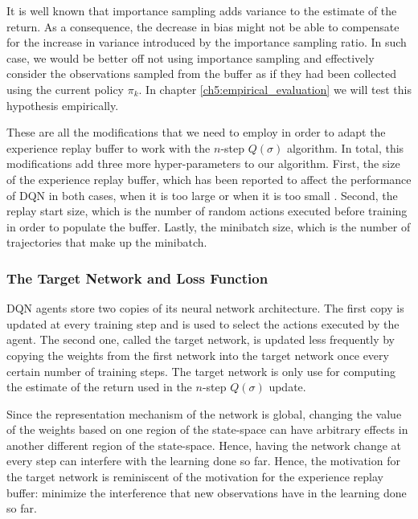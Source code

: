 It is well known that importance sampling adds variance to the estimate of the return.
As a consequence, the decrease in bias might not be able to compensate for the increase in variance introduced by the importance sampling ratio.
In such case, we would be better off not using importance sampling and effectively consider the observations sampled from the buffer as if they had been collected using the current policy $\pi_k$.
In chapter \ref{ch5:empirical_evaluation} we will test this hypothesis empirically.

These are all the modifications that we need to employ in order to adapt the experience replay buffer to work with the $n$-step $Q(\sigma)$ algorithm.
In total, this modifications add three more hyper-parameters to our algorithm.
First, the size of the experience replay buffer, which has been reported to affect the performance of DQN in both cases, when it is too large or when it is too small \parencite{shangtong2017}.
Second, the replay start size, which is the number of random actions executed before training in order to populate the buffer.
Lastly, the minibatch size, which is the number of trajectories that make up the minibatch.

\subsubsection{The Target Network and Loss Function}

DQN agents store two copies of its neural network architecture.
The first copy is updated at every training step and is used to select the actions executed by the agent.
The second one, called the target network, is updated less frequently by copying the weights from the first network into the target network once every certain number of training steps.
The target network is only use for computing the estimate of the return used in the $n$-step $Q(\sigma)$ update.

Since the representation mechanism of the network is global, changing the value of the weights based on one region of the state-space can have arbitrary effects in another different region of the state-space. 
Hence, having the network change at every step can interfere with the learning done so far.
Hence, the motivation for the target network is reminiscent of the motivation for the experience replay buffer: minimize the interference that new observations have in the learning done so far.

